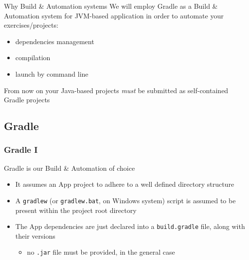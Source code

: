 \documentclass[handout]{beamer}\mode<presentation>{\usetheme{AMSCesenaBleu}}
\begin{document}
\begin{frame}{Why Build \& Automation systems}
    We will employ Gradle as a Build \& Automation system for JVM-based application in order to automate your exercises/projects:
    \begin{itemize}
        \item dependencies management
        \item compilation
        \item launch by command line
    \end{itemize}
    
    \vspace{1cm}\pause
    
    \begin{block}{}
        \alert{From now on} your Java-based projects \emph{must} be submitted as self-contained Gradle projects
    \end{block}
\end{frame}

\subsection{Gradle}

\begin{frame}
\frametitle{Gradle I}

    Gradle is our Build \& Automation of choice
    \vfill{}%
    \begin{itemize}
        \item<2> It assumes an App project to adhere to a well defined \alert{directory structure}
        \pause\vfill{}
        \item<3> A \alert{\texttt{gradlew}} (or \texttt{gradlew.bat}, on Windows system) script is assumed to be present within the project root directory
        \pause\vfill{}
        \item<4> The App dependencies are just \alert{declared} into a \alert{\texttt{build.gradle}} file, along with their versions
        \begin{itemize}
            \item<4> no \texttt{.jar} file must be provided, in the general case
        \end{itemize} 
    \end{itemize}
    
\end{frame}
\end{document}
